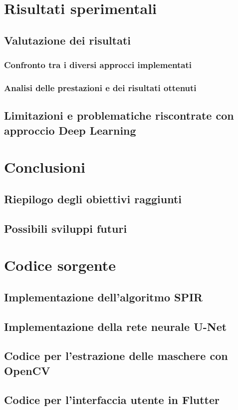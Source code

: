 \documentclass[a4paper,12pt]{report}
\begin{document}
\chapter{Risultati sperimentali}
  \section{Valutazione dei risultati}
    \subsection{Confronto tra i diversi approcci implementati}
    \subsection{Analisi delle prestazioni e dei risultati ottenuti}
  \section{Limitazioni e problematiche riscontrate con approccio Deep Learning}

\chapter{Conclusioni}
  \section{Riepilogo degli obiettivi raggiunti}
  \section{Possibili sviluppi futuri}

\chapter{Codice sorgente}
  \section{Implementazione dell'algoritmo SPIR}
  \section{Implementazione della rete neurale U-Net}
  \section{Codice per l'estrazione delle maschere con OpenCV}
  \section{Codice per l'interfaccia utente in Flutter}
\end{document}
